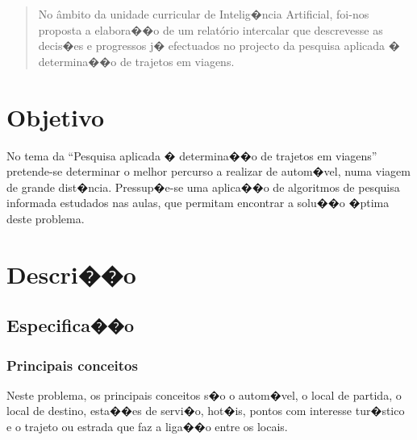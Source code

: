 \documentclass[a4paper,11pt]{article}
\begin{document}
\newpage
\tableofcontents
\newpage

\begin{abstract}
No âmbito da unidade curricular de Intelig�ncia Artificial, foi-nos proposta a
elabora��o de um relatório intercalar que descrevesse as decis�es e progressos
j� efectuados no projecto da pesquisa aplicada � determina��o de trajetos em viagens.
\end{abstract}

\section{Objetivo}

No tema da ``Pesquisa aplicada � determina��o de trajetos em viagens'' pretende-se determinar o melhor percurso a realizar de autom�vel, numa viagem de grande dist�ncia. Pressup�e-se uma aplica��o de algoritmos de pesquisa informada estudados nas aulas, que permitam encontrar a solu��o �ptima deste problema.

\section{Descri��o}
\subsection{Especifica��o}

\subsubsection{Principais conceitos}
Neste problema, os principais conceitos s�o o autom�vel, o local de partida, o local de destino, esta��es de servi�o, hot�is, pontos com interesse tur�stico e o trajeto ou estrada que faz a liga��o entre os locais.
\end{document}
